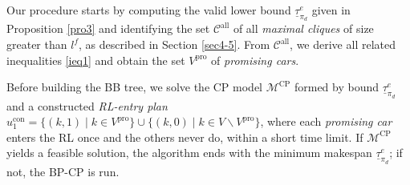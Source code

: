 \documentclass[12pt]{article}
\begin{document}

Our procedure starts by computing the valid lower bound $\underline{\tau}^e_{\pi_d}$ given in Proposition \ref{pro3} and identifying the set $\mathcal{C}^{\text{all}}$ of all \textit{maximal cliques} of size greater than $l^f$, as described in Section \ref{sec4-5}. From $\mathcal{C}^{\text{all}}$, we derive all related inequalities \eqref{ieq1} and obtain the set $V^{\text{pro}}$ of \textit{promising cars}.


Before building the BB tree, we solve the CP model $\mathcal{M}^{\text{CP}}$ formed by bound $\underline{\tau}^e_{\pi_d}$ and a constructed \textit{RL-entry plan} $u^{\text{con}}_1=\{(k,1)\mid k\in V^{\text{pro}}\}\cup \{(k,0)\mid k\in V\backslash V^{\text{pro}}\}$, where each \textit{promising car} enters the RL once and the others never do, within a short time limit. If $\mathcal{M}^{\text{CP}}$ yields a feasible solution, the algorithm ends with the minimum makespan $\underline{\tau}^e_{\pi_d}$; if not, the BP-CP is run. %




\end{document}
